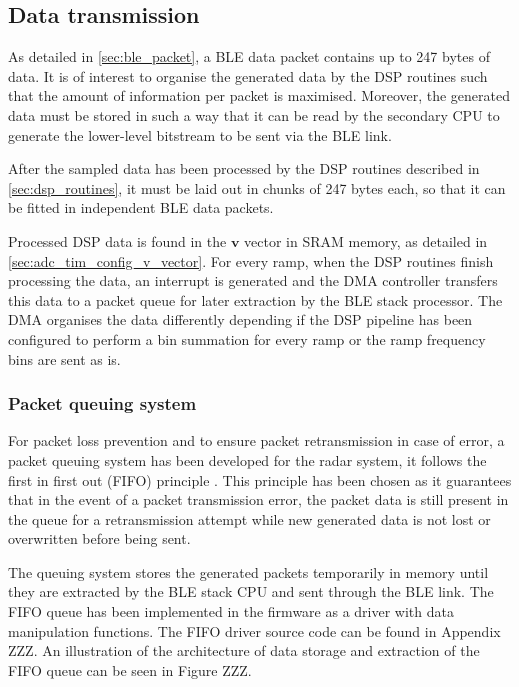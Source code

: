 \subsection{Data transmission} \label{sec:data_transmission}

As detailed in \cref{sec:ble_packet}, a BLE data packet contains up to 247 bytes of data. It is of interest to organise the generated data by the DSP routines such that the amount of information per packet is maximised. Moreover, the generated data must be stored in such a way that it can be read by the secondary CPU to generate the lower-level bitstream to be sent via the BLE link.

After the sampled data has been processed by the DSP routines described in \cref{sec:dsp_routines}, it must be laid out in chunks of 247 bytes each, so that it can be fitted in independent BLE data packets.

Processed DSP data is found in the $\mathbf{v}$ vector in SRAM memory, as detailed in \cref{sec:adc_tim_config_v_vector}. For every ramp, when the DSP routines finish processing the data, an interrupt is generated and the DMA controller transfers this data to a packet queue for later extraction by the BLE stack processor. The DMA organises the data differently depending if the DSP pipeline has been configured to perform a bin summation for every ramp or the ramp frequency bins are sent as is.

\subsubsection{Packet queuing system}

For packet loss prevention and to ensure packet retransmission in case of error, a packet queuing system has been developed for the radar system, it follows the first in first out (FIFO) principle \cite{Tanenbaum2015,Kurose2006}. This principle has been chosen as it guarantees that in the event of a packet transmission error, the packet data is still present in the queue for a retransmission attempt while new generated data is not lost or overwritten before being sent.

The queuing system stores the generated packets temporarily in memory until they are extracted by the BLE stack CPU and sent through the BLE link. The FIFO queue has been implemented in the firmware as a driver with data manipulation functions. The FIFO driver source code can be found in Appendix ZZZ. An illustration of the architecture of data storage and extraction of the FIFO queue can be seen in Figure ZZZ.

